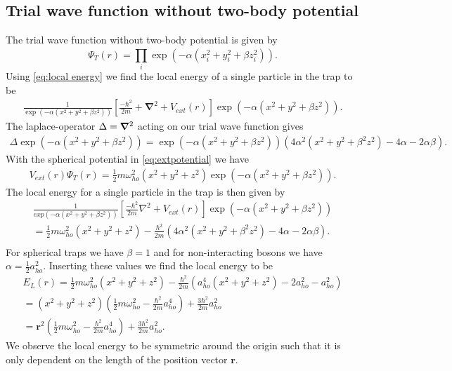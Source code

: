\subsection{Trial wave function without two-body potential}
\label{sec:Trial wave function without two-body potential}
The trial wave function without two-body potential is given by
\begin{equation}
	\label{eq:trial wave function without two-body potential}
	\Psi_T(r) = \prod_{i}^{} \exp(-\alpha (x_i^2 + y_i^2 + \beta z_i^2)) .
\end{equation}
Using \autoref{eq:local energy} we find the local energy of a single particle in the trap to be
\begin{gather*}
	\frac{1}{\exp(-\alpha (x^2+y^2+\beta z^2))}\left[\frac{-\hbar^2}{2m} +\boldsymbol{\nabla}^2 + V _{ext}(r)\right]	\exp(-\alpha (x^2+y^2+\beta z^2)).
\end{gather*}
The laplace-operator $\Delta  = \grad^2$  acting on our trial wave function gives
\begin{gather*}
	\Delta \exp(-\alpha (x^2+y^2+\beta z^2)) = \exp(-\alpha (x^2+y^2+\beta z^2)) \left(4\alpha^2 (x^2+y^2+\beta^2 z^2) - 4 \alpha -2\alpha \beta \right).
\end{gather*}
With the spherical potential in \autoref{eq:extpotential} we have
\begin{gather*}
	V _{ext}(r) \Psi _T(r) = \frac{1}{2}m \omega _{ho}^2(x^2+y^2+z^2) \exp(-\alpha (x^2+y^2+\beta z^2)).
\end{gather*}
The local energy for a single particle in the trap is then given by
\begin{gather*}
	\frac{1}{exp(-\alpha (x^2+y^2+\beta z^2))}\left[\frac{-\hbar^2}{2m} \nabla^2 + V _{ext}(r)\right]	\exp(-\alpha (x^2+y^2+\beta z^2)) \\
	= \frac{1}{2}m \omega _{ho}^2(x^2+y^2+z^2) - \frac{\hbar ^2}{2m} \left(4\alpha^2 (x^2+y^2+\beta^2 z^2) - 4 \alpha -2\alpha \beta \right).\\
\end{gather*}
For spherical traps we have $\beta = 1$ and for non-interacting bosons we have $\alpha =\frac{1}{2}a ^2 _{ho}$. Inserting
these values we find the local energy to be
\begin{gather*}
	E_L(r) = \frac{1}{2}m \omega _{ho}^2(x^2+y^2+z^2) - \frac{\hbar ^2}{2m} \left(a _{ho}^4 (x^2+y^2+z^2) - 2 a^2 _{ho} -a^2 _{ho} \right) \\
	= (x^2+y^2+z^2)\left(\frac{1}{2}m\omega _{ho}^2-\frac{\hbar ^2}{2m}a^4
	_{ho}\right)+\frac{3\hbar ^2}{2m}a^2 _{ho} \\
	= \boldsymbol{r}^2 \left(\frac{1}{2}m\omega _{ho}^2-\frac{\hbar ^2}{2m}a^4 _{ho}\right)+\frac{3\hbar ^2}{2m}a^2 _{ho}.
\end{gather*}
We observe the local energy to be symmetric around the origin such that it is only dependent on the
length of the position vector $\boldsymbol{r}$.


